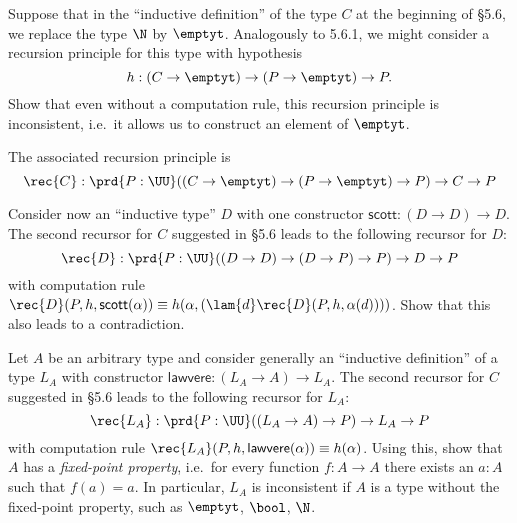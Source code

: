 Suppose that in the ``inductive definition'' of the type $C$ at the beginning
of \S5.6, we replace the type $\N$ by $\emptyt$.  Analogously to
5.6.1, we might consider a recursion principle for this type with hypothesis
\[
  h : (C \to \emptyt) \to (P \to \emptyt) \to P.
\]
Show that even without a computation rule, this recursion principle is
inconsistent, i.e.~it allows us to construct an element of $\emptyt$.


 \soln
The associated recursion principle is
\[
  \rec{C} : \prd{P:\UU} ((C \to \emptyt) \to (P \to \emptyt) \to P) \to C \to P
\]


Consider now an ``inductive type'' $D$ with one constructor $\mathsf{scott} :
(D \to D) \to D$.  The second recursor for $C$ suggested in \S5.6 leads to
the following recursor for $D$:
\[
  \rec{D} : \prd{P:\UU} ((D \to D) \to (D \to P) \to P) \to D \to P
\]
with computation rule $\rec{D}(P, h, \mathsf{scott}(\alpha)) \equiv h(\alpha,
(\lam{d}\rec{D}(P, h, \alpha(d))))$. Show that this also leads to a
contradiction.


Let $A$ be an arbitrary type and consider generally an ``inductive definition''
of a type $L_{A}$ with constructor $\mathsf{lawvere}:(L_{A} \to A) \to L_{A}$.
The second recursor for $C$ suggested in \S5.6 leads to the following
recursor for $L_{A}$:
\[
  \rec{L_{A}} : \prd{P:\UU} ((L_{A} \to A) \to P) \to L_{A} \to P
\]
with computation rule $\rec{L_{A}}(P, h, \mathsf{lawvere}(\alpha)) \equiv
h(\alpha)$.  Using this, show that $A$ has a \textit{fixed-point property}, i.e.~for
every function $f : A \to A$ there exists an $a : A$ such that $f(a) = a$.  In
particular, $L_{A}$ is inconsistent if $A$ is a type without the fixed-point
property, such as $\emptyt$, $\bool$, $\N$.



